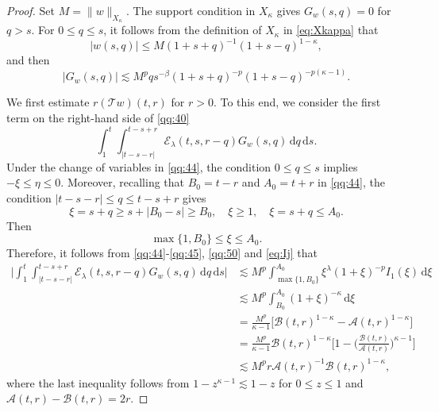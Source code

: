 \documentclass[10pt,a4paper]{amsart}
\newcommand{\Acal}{\mathcal A}
\newcommand{\Bcal}{\mathcal B}
\newcommand{\Ecal}{\mathcal E}
\newcommand{\Tcal}{\mathcal T}
\newcommand{\dd}{\,\mathrm{d}}
\newcommand{\f}{\frac}
\begin{document}
\begin{proof}
Set
$
M=\|w\|_{X_\kappa}.
$
The support condition in $X_\kappa$ gives $G_w(s,q)=0$ for $q>s$.
For $0\leq q\leq s$, it follows from the definition of $X_\kappa$ in \eqref{eq:Xkappa}
that
\begin{equation}
\label{qq:50'}
|w(s,q)|
\leq
M(1+s+q)^{-1}(1+s-q)^{1-\kappa},
\end{equation}
and then
\begin{equation}
\label{qq:50}
|G_w(s,q)|
\lesssim
M^p q s^{-\beta}
(1+s+q)^{-p}
(1+s-q)^{-p(\kappa-1)}.
\end{equation}

We first estimate $r(\Tcal w)(t,r)$ for $r>0$. To this end, we consider the first
term on the right-hand side of \eqref{qq:40}
\[
\int_1^t
\int_{|t-s-r|}^{t-s+r}
\Ecal_\lambda(t,s,r-q)
G_w(s,q)\dd q\dd s.
\]
Under the change of variables in \eqref{qq:44}, the condition
$0\leq q\leq s$ implies
$
-\xi\leq\eta\leq0.
$
Moreover, recalling that $B_0=t-r$ and $A_0=t+r$ in \eqref{qq:44},
the condition $|t-s-r|\leq q\leq t-s+r$ gives
\[
\xi=s+q
\geq
s+|B_0-s|
\geq
B_0,
\quad
\xi\geq1,
\quad
\xi=s+q\leq A_0.
\]
Then
\[
\max\{1,B_0\}\leq\xi\leq A_0.
\]
Therefore, it follows from \eqref{qq:44}-\eqref{qq:45}, \eqref{qq:50} and \eqref{eq:Ij} that
\begin{equation}\label{QQ-44}
\begin{aligned}
\big|
\int_1^t
\int_{|t-s-r|}^{t-s+r}
\Ecal_\lambda(t,s,r-q)
G_w(s,q)\dd q\dd s
\big|
&\lesssim
M^p
\int_{\max\{1,B_0\}}^{A_0}
\xi^\lambda(1+\xi)^{-p}
I_1(\xi)\dd\xi\\
&\lesssim
M^p
\int_{B_0}^{A_0}
(1+\xi)^{-\kappa}\dd\xi\\
&=
\f{M^p}{\kappa-1}
\big[
\Bcal(t,r)^{1-\kappa}
-
\Acal(t,r)^{1-\kappa}
\big]\\
&=\f{M^p}{\kappa-1}\Bcal(t,r)^{1-\kappa}
\big[
1-
\big(
\f{\Bcal(t,r)}{\Acal(t,r)}
\big)^{\kappa-1}
\big]\\
&\lesssim
M^p r
\Acal(t,r)^{-1}
\Bcal(t,r)^{1-\kappa},
\end{aligned}
\end{equation}
where the last inequality follows from
$1-z^{\kappa-1}\lesssim1-z$ for $0\leq z\leq1$ and
$\Acal(t,r)-\Bcal(t,r)=2r$.


\end{proof}
\end{document}
